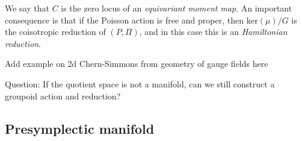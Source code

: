 We say that $C$ is the zero locus of an \textit{equivariant moment map}.
% 
An important consequence is that if the Poisson action is free and proper, then $\mathrm{ker}(\mu)/G$ is the coisotropic reduction of $(P, \Pi)$, and in this case this is an \textit{Hamiltonian reduction}.
% 
\begin{tcolorbox}
    Add example on 2d Chern-Simmons from geometry of gauge fields here
\end{tcolorbox}
% 
Question:
    If the quotient space is not a manifold, can we still construct a groupoid action and reduction?
% 
\subsection{Presymplectic manifold} %
\label{sub:presymplectic_mfd}
\label{def:presymplectic manifold}

